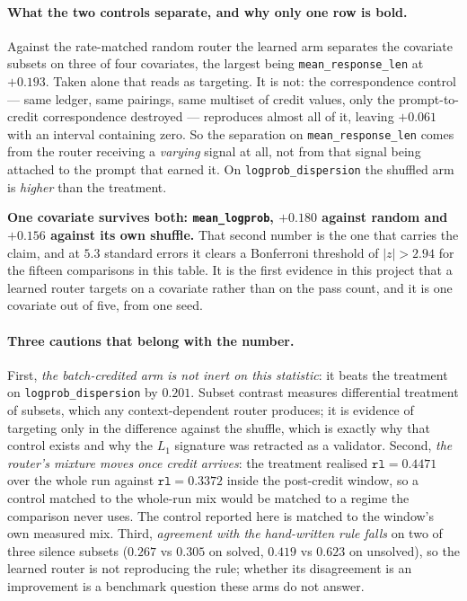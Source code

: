 \paragraph{What the two controls separate, and why only one row is bold.} Against the
rate-matched random router the learned arm separates the covariate subsets on three of four
covariates, the largest being \texttt{mean\_response\_len} at $+0.193$. Taken alone that reads
as targeting. It is not: the correspondence control --- same ledger, same pairings, same
multiset of credit values, only the prompt-to-credit correspondence destroyed --- reproduces
almost all of it, leaving $+0.061$ with an interval containing zero. So the separation on
\texttt{mean\_response\_len} comes from the router receiving a \emph{varying} signal at all, not
from that signal being attached to the prompt that earned it. On
\texttt{logprob\_dispersion} the shuffled arm is \emph{higher} than the treatment.

\textbf{One covariate survives both: \texttt{mean\_logprob}, $+0.180$ against random and
$+0.156$ against its own shuffle.} That second number is the one that carries the claim, and at
$5.3$ standard errors it clears a Bonferroni threshold of $|z|>2.94$ for the fifteen
comparisons in this table. It is the first evidence in this project that a learned router
targets on a covariate rather than on the pass count, and it is one covariate out of five, from
one seed.

\paragraph{Three cautions that belong with the number.} First, \emph{the batch-credited arm is
not inert on this statistic}: it beats the treatment on \texttt{logprob\_dispersion} by $0.201$.
Subset contrast measures differential treatment of subsets, which any context-dependent router
produces; it is evidence of targeting only in the difference against the shuffle, which is
exactly why that control exists and why the $L_1$ signature was retracted as a validator.
Second, \emph{the router's mixture moves once credit arrives}: the treatment realised
$\mathtt{rl}=0.4471$ over the whole run against $\mathtt{rl}=0.3372$ inside the post-credit
window, so a control matched to the whole-run mix would be matched to a regime the comparison
never uses. The control reported here is matched to the window's own measured mix. Third,
\emph{agreement with the hand-written rule falls} on two of three silence subsets
($0.267$ vs $0.305$ on solved, $0.419$ vs $0.623$ on unsolved), so the learned router is not
reproducing the rule; whether its disagreement is an improvement is a benchmark question these
arms do not answer.

